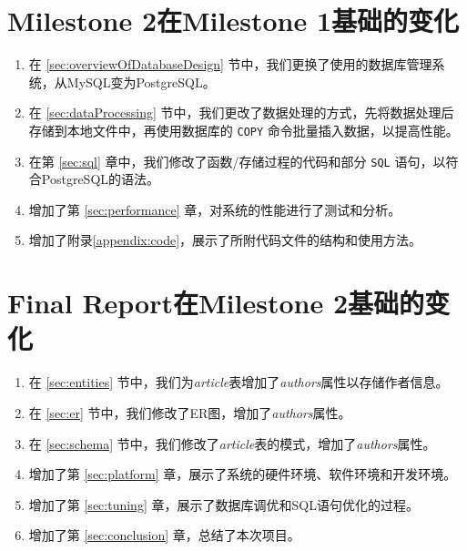 \documentclass[UTF8,openany]{ctexbook}
\begin{document}
\newpage

\chapter{Milestone 2在Milestone 1基础的变化}

\begin{enumerate}
    \item 在 \ref{sec:overviewOfDatabaseDesign} 节中，我们更换了使用的数据库管理系统，从MySQL变为PostgreSQL。
    \item 在 \ref{sec:dataProcessing} 节中，我们更改了数据处理的方式，先将数据处理后存储到本地文件中，再使用数据库的 \texttt{COPY} 命令批量插入数据，以提高性能。
    \item 在第 \ref{sec:sql} 章中，我们修改了函数/存储过程的代码和部分 \texttt{SQL} 语句，以符合PostgreSQL的语法。
    \item 增加了第 \ref{sec:performance} 章，对系统的性能进行了测试和分析。
    \item 增加了附录\ref{appendix:code}，展示了所附代码文件的结构和使用方法。
\end{enumerate}

\newpage

\chapter{Final Report在Milestone 2基础的变化}

\begin{enumerate}
    \item 在 \ref{sec:entities} 节中，我们为\textit{article}表增加了\textit{authors}属性以存储作者信息。
    \item 在 \ref{sec:er} 节中，我们修改了ER图，增加了\textit{authors}属性。
    \item 在 \ref{sec:schema} 节中，我们修改了\textit{article}表的模式，增加了\textit{authors}属性。
    \item 增加了第 \ref{sec:platform} 章，展示了系统的硬件环境、软件环境和开发环境。
    \item 增加了第 \ref{sec:tuning} 章，展示了数据库调优和SQL语句优化的过程。
    \item 增加了第 \ref{sec:conclusion} 章，总结了本次项目。
\end{enumerate}
\end{document}

